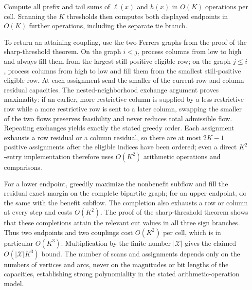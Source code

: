 Compute all prefix and tail sums of \(\ell(x)\) and \(h(x)\) in \(O(K)\) operations per cell.  Scanning the \(K\) thresholds then computes both displayed endpoints in \(O(K)\) further operations, including the separate tie branch.

To return an attaining coupling, use the two Ferrers graphs from the proof of the sharp-threshold theorem.  On the graph \(i<j\), process columns from low to high and always fill them from the largest still-positive eligible row; on the graph \(j\le i\), process columns from high to low and fill them from the smallest still-positive eligible row.  At each assignment send the smaller of the current row and column residual capacities.  The nested-neighborhood exchange argument proves maximality: if an earlier, more restrictive column is supplied by a less restrictive row while a more restrictive row is sent to a later column, swapping the smaller of the two flows preserves feasibility and never reduces total admissible flow.  Repeating exchanges yields exactly the stated greedy order.  Each assignment exhausts a row residual or a column residual, so there are at most \(2K-1\) positive assignments after the eligible indices have been ordered; even a direct \(K^2\)-entry implementation therefore uses \(O(K^2)\) arithmetic operations and comparisons.

For a lower endpoint, greedily maximize the nonbenefit subflow and fill the residual exact margin on the complete bipartite graph; for an upper endpoint, do the same with the benefit subflow.  The completion also exhausts a row or column at every step and costs \(O(K^2)\).  The proof of the sharp-threshold theorem shows that these completions attain the relevant cut values in all three sign branches.  Thus two endpoints and two couplings cost \(O(K^2)\) per cell, which is in particular \(O(K^3)\).  Multiplication by the finite number \(|\mathcal X|\) gives the claimed \(O(|\mathcal X|K^3)\) bound.  The number of scans and assignments depends only on the numbers of vertices and arcs, never on the magnitudes or bit lengths of the capacities, establishing strong polynomiality in the stated arithmetic-operation model.
